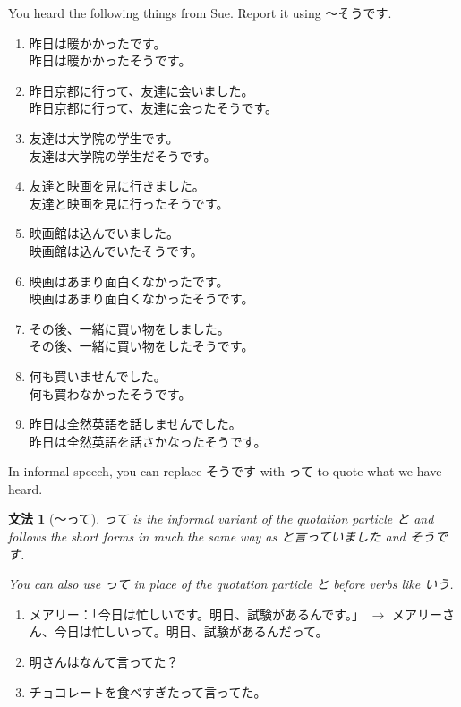 \documentclass[notoc,notitlepage]{tufte-book}
\newtheorem{grammar}{\faBook \enspace 文法}[section]
\begin{document}
\begin{ex}\label{eg:genki2_129pg_i_partA}
  You heard the following things from Sue. Report it using 〜そうです.
  \begin{enumerate}
    \item 昨日は暖かかったです。\\
      昨日は暖かかったそうです。
    \item 昨日京都に行って、友達に会いました。\\
      昨日京都に行って、友達に会ったそうです。
    \item 友達は大学院の学生です。\\
      友達は大学院の学生だそうです。
    \item 友達と映画を見に行きました。\\
      友達と映画を見に行ったそうです。
    \item 映画館は込んでいました。\\
      映画館は込んでいたそうです。
    \item 映画はあまり面白くなかったです。\\
      映画はあまり面白くなかったそうです。
    \item その後、一緒に買い物をしました。\\
      その後、一緒に買い物をしたそうです。
    \item 何も買いませんでした。\\
      何も買わなかったそうです。
    \item 昨日は全然英語を話しませんでした。\\
      昨日は全然英語を話さかなったそうです。
  \end{enumerate}
\end{ex}

In informal speech, you can replace そうです with って to quote what we have heard. 

\begin{grammar}[〜って]
\label{grammar:_tsute}
  って is the informal variant of the quotation particle と and follows the short forms in much the same way as と言っていました and そうです.

  You can also use って in place of the quotation particle と before verbs like いう.
\end{grammar}

\begin{eg}
  \begin{enumerate}
    \item メアリー：「今日は忙しいです。明日、試験があるんです。」 $\to$ メアリーさん、今日は忙しいって。明日、試験があるんだって。
    \item 明さんはなんて言ってた？
    \item チョコレートを食べすぎたって言ってた。
  \end{enumerate}
\end{eg}
\end{document}
